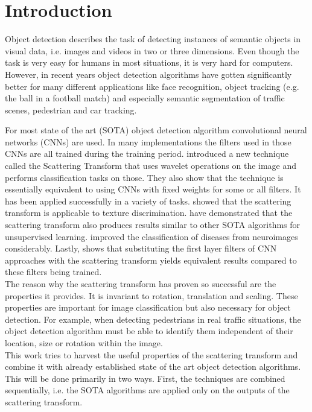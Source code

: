 \chapter{Introduction}
\label{chap:introduction}

Object detection describes the task of detecting instances of semantic objects in visual data, i.e. images and videos in two or three dimensions. Even though the task is very easy for humans in most situations, it is very hard for computers. However, in recent years object detection algorithms have gotten significantly better for many different applications like face recognition, object tracking (e.g. the ball in a football match) and especially semantic segmentation of traffic scenes, pedestrian and car tracking. 

For most state of the art (SOTA) object detection algorithm convolutional neural networks (CNNs) are used. In many implementations the filters used in those CNNs are all trained during the training period. \cite{scatteringTransform2012}
introduced a new technique called the Scattering Transform that uses wavelet operations on the image and performs classification tasks on those. They also show that the technique is essentially equivalent to using CNNs with fixed weights for some or all filters. It has been applied successfully in a variety of tasks. \cite{InvariantScatteringTextureDiscrimination2013} showed that the scattering transform is applicable to texture discrimination. \cite{DeepRotoTranslation2014} have demonstrated that the scattering transform also produces results similar to other SOTA algorithms for unsupervised learning. \cite{3DScatteringTransformNeuro2017} improved the classification of diseases from neuroimages considerably. Lastly, \cite{ScalingTheScatteringTransform2017} shows that substituting the first layer filters of CNN approaches with the scattering transform yields equivalent results compared to these filters being trained.\\
The reason why the scattering transform has proven so successful are the properties it provides. It is invariant to rotation, translation and scaling. These properties are important for image classification but also necessary for object detection. For example, when detecting pedestrians in real traffic situations, the object detection algorithm must be able to identify them independent of their location, size or rotation within the image. \\
This work tries to harvest the useful properties of the scattering transform and combine it with already established state of the art object detection algorithms. This will be done primarily in two ways. First, the techniques are combined sequentially, i.e. the SOTA algorithms are applied only on the outputs of the scattering transform. \cite{ScalingTheScatteringTransform2017}
